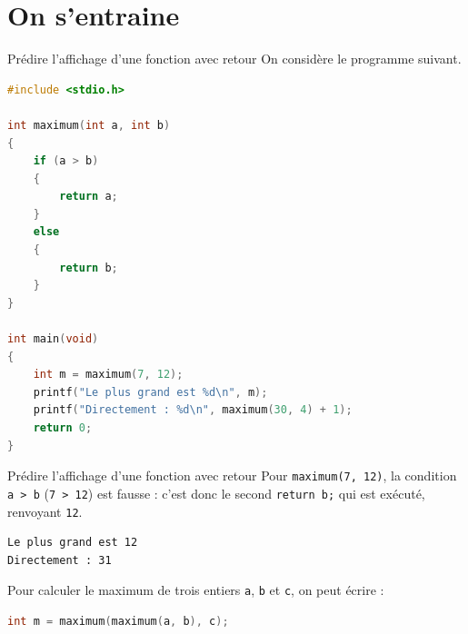 \section{On s'entraine}
\begin{UPSTIexercice}{Prédire l'affichage d'une fonction avec retour}
    On considère le programme suivant.
    \begin{lstlisting}[language=C]
#include <stdio.h>

int maximum(int a, int b)
{
    if (a > b)
    {
        return a;
    }
    else
    {
        return b;
    }
}

int main(void)
{
    int m = maximum(7, 12);
    printf("Le plus grand est %d\n", m);
    printf("Directement : %d\n", maximum(30, 4) + 1);
    return 0;
}
    \end{lstlisting}
\end{UPSTIexercice}

\begin{UPSTIprofOnlyEnv}
    \begin{UPSTIcorrectionP}{Prédire l'affichage d'une fonction avec retour}
        Pour \texttt{maximum(7, 12)}, la condition \texttt{a > b} (\texttt{7 > 12}) est fausse : c'est donc le second \texttt{return b;} qui est exécuté, renvoyant \texttt{12}.
        \begin{lstlisting}[language=bash,style=console]
Le plus grand est 12
Directement : 31
        \end{lstlisting}
        Pour calculer le maximum de trois entiers \texttt{a}, \texttt{b} et \texttt{c}, on peut écrire :
        \begin{lstlisting}[language=C]
int m = maximum(maximum(a, b), c);
\end{lstlisting}
    \end{UPSTIcorrectionP}
\end{UPSTIprofOnlyEnv}



